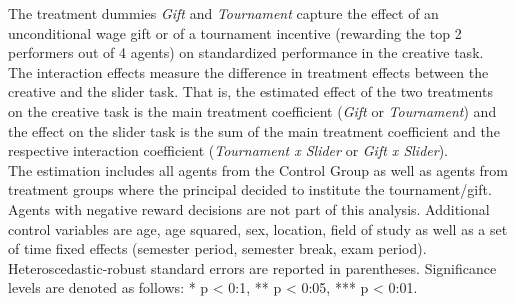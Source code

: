 \begin{table}[h]
\begin{center}
\begin{minipage}{\textwidth}
The treatment dummies \textit{Gift} and \textit{Tournament} capture the effect of an unconditional wage gift or of a tournament incentive (rewarding the top 2 performers out of 4 agents) on standardized performance in the creative task. 
The interaction effects measure the difference in treatment effects between the creative and the slider task. 
That is, the estimated effect of the two treatments on the creative task is the main treatment coefficient (\textit{Gift} or \textit{Tournament}) and the effect on the slider task is the sum of the main treatment coefficient and the respective interaction coefficient (\textit{Tournament x Slider} or \textit{Gift x Slider}). \\
The estimation includes all agents from the Control Group as well as agents from treatment groups where the principal decided to institute the tournament/gift. Agents with negative reward decisions are not part of this analysis. 
Additional control variables are age, age squared, sex, location, field of study as well as a set of time fixed effects (semester period, semester break, exam period). 
Heteroscedastic-robust standard errors are reported in parentheses. Significance levels are denoted as follows: * p < 0:1, ** p < 0:05, *** p < 0:01. 
\end{minipage}
\end{center}
\end{table}
